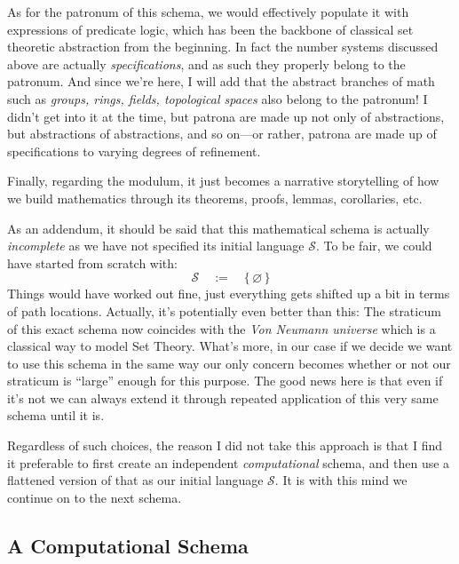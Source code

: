 \documentclass[twoside]{article}
\newcommand{\qdefeq}{\ensuremath{\quad :=\quad}}
\begin{document}
As for the patronum of this schema, we would effectively populate it with expressions of predicate logic, which has been the
backbone of classical set theoretic abstraction from the beginning. In fact the number systems discussed above are actually
\emph{specifications}, and as such they properly belong to the patronum. And since we're here, I will add that the abstract
branches of math such as \emph{groups, rings, fields, topological spaces} also belong to the patronum! I didn't get into
it at the time, but patrona are made up not only of abstractions, but abstractions of abstractions, and so on---or rather,
patrona are made up of specifications to varying degrees of refinement.

Finally, regarding the modulum, it just becomes a narrative storytelling of how we build mathematics through its theorems,
proofs, lemmas, corollaries, etc.

As an addendum, it should be said that this mathematical schema is actually \emph{incomplete} as we have not specified its
initial language $ \mathcal{S} $. To be fair, we could have started from scratch with:
$$ \mathcal{S} \qdefeq \{\,\varnothing\,\} $$
Things would have worked out fine, just everything gets shifted up a bit in terms of path locations. Actually, it's potentially
even better than this: The straticum of this exact schema now coincides with the \emph{Von Neumann universe} which is a classical
way to model Set Theory. What's more, in our case if we decide we want to use this schema in the same way our only concern becomes
whether or not our straticum is ``large'' enough for this purpose. The good news here is that even if it's not we can always
extend it through repeated application of this very same schema until it is.

Regardless of such choices, the reason I did not take this approach is that I find it preferable to first create an independent
\emph{computational} schema, and then use a flattened version of that as our initial language $ \mathcal{S} $. It is with this
mind we continue on to the next schema.

\subsection*{A Computational Schema}
\end{document}
